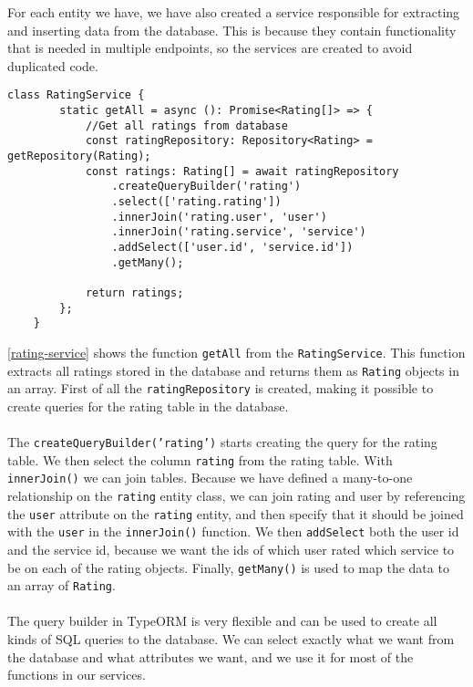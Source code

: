 For each entity we have, we have also created a service responsible for extracting and inserting data from the database.
This is because they contain functionality that is needed in multiple endpoints, so the services are created to avoid duplicated code.
\begin{lstlisting}[caption={Shows the function used to get get all ratings from the rating service}, captionpos=b, label={rating-service}]
    class RatingService {
        static getAll = async (): Promise<Rating[]> => {
            //Get all ratings from database
            const ratingRepository: Repository<Rating> = getRepository(Rating);
            const ratings: Rating[] = await ratingRepository
                .createQueryBuilder('rating')
                .select(['rating.rating'])
                .innerJoin('rating.user', 'user')
                .innerJoin('rating.service', 'service')
                .addSelect(['user.id', 'service.id'])
                .getMany();
    
            return ratings;
        };
    }
\end{lstlisting}
\autoref{rating-service} shows the function \texttt{getAll} from the \texttt{RatingService}.
This function extracts all ratings stored in the database and returns them as \texttt{Rating} objects in an array.
First of all the \texttt{ratingRepository} is created, making it possible to create queries for the rating table in the database. 
\\\\
The \texttt{createQueryBuilder('rating')} starts creating the query for the rating table. 
We then select the column \texttt{rating} from the rating table. 
With \texttt{innerJoin()} we can join tables.
Because we have defined a many-to-one relationship on the \texttt{rating} entity class, we can join rating and user by referencing the \texttt{user} attribute on the \texttt{rating} entity, and then specify that it should be joined with the \texttt{user} in the \texttt{innerJoin()} function. 
We then \texttt{addSelect} both the user id and the service id, because we want the ids of which user rated which service to be on each of the rating objects. 
Finally, \texttt{getMany()} is used to map the data to an array of \texttt{Rating}.
\\\\
The query builder in TypeORM is very flexible and can be used to create all kinds of SQL queries to the database. 
We can select exactly what we want from the database and what attributes we want, and we use it for most of the functions in our services.


